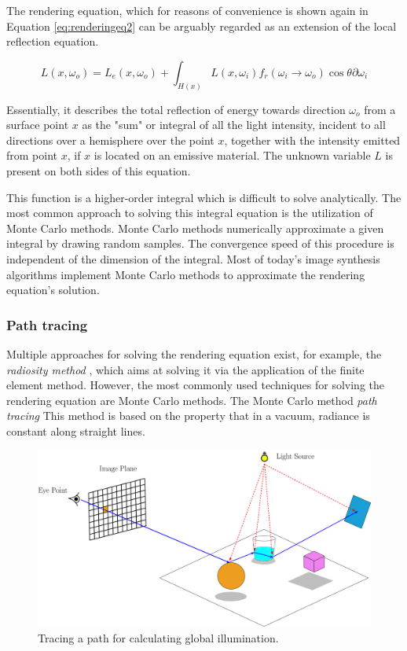The rendering equation, which for reasons of convenience is shown again in Equation \ref{eq:renderingeq2} can be arguably regarded as an extension of the local reflection equation.

\begin{equation}\label{eq:renderingeq2}
L(x, \omega_{o}) = L_{e}(x, \omega_{o}) + \int_{H(x)} L(x, \omega_{i})f_{r}(\omega_{i} \rightarrow \omega_{o})\cos\theta\partial\omega_{i}
\end{equation}

Essentially, it describes the total reflection of energy towards direction $\omega_{o}$ from a surface point $x$ as the "sum" or integral of all the light intensity, incident to all directions over a hemisphere over the point $x$, together with the intensity emitted from point $x$, if $x$ is located on an emissive material. The unknown variable $L$ is present on both sides of this equation.

This function is a higher-order integral which is difficult to solve analytically. The most common approach to solving this integral equation is the utilization of Monte Carlo methods. Monte Carlo methods numerically approximate a given integral by drawing random samples. The convergence speed of this procedure is independent of the dimension of the integral. Most of today's image synthesis algorithms implement Monte Carlo methods to approximate the rendering equation's solution.



\subsubsection{Path tracing}

Multiple approaches for solving the rendering equation exist, for example, the \emph{radiosity method} \cite{goral1984modeling}, which aims at solving it via the application of the finite element method. However, the most commonly used techniques for solving the rendering equation are Monte Carlo methods.
The Monte Carlo method \emph{path tracing} This method is based on the property that in a vacuum, radiance is constant along straight lines.   

\begin{figure}
	\centering
	\includegraphics[width=1\linewidth]{img/1 fundamentals/path_tracing.png}
	\caption{Tracing a path for calculating global illumination.}
	\label{fig:pathtracing}
\end{figure}


